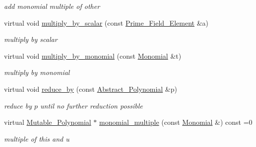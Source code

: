 \begin{Indent}
\begin{DoxyCompactItemize}
\begin{DoxyCompactList}\small\item\em add monomial multiple of other \end{DoxyCompactList}\item 
\mbox{\label{group__polygroup_a19f2326427ab08d6dc160c5eca898529}} 
virtual void \hyperlink{group__polygroup_a19f2326427ab08d6dc160c5eca898529}{multiply\+\_\+by\+\_\+scalar} (const \hyperlink{group___fields_group_class_prime___field___element}{Prime\+\_\+\+Field\+\_\+\+Element} \&a)
\begin{DoxyCompactList}\small\item\em multiply by scalar \end{DoxyCompactList}\item 
\mbox{\label{group__polygroup_a97a3ca070811ac495e8f22c3d7623225}} 
virtual void \hyperlink{group__polygroup_a97a3ca070811ac495e8f22c3d7623225}{multiply\+\_\+by\+\_\+monomial} (const \hyperlink{group__polygroup_class_monomial}{Monomial} \&t)
\begin{DoxyCompactList}\small\item\em multiply by monomial \end{DoxyCompactList}\item 
\mbox{\label{group__polygroup_a0f40d2041aa5c3447324bde0c14049e2}} 
virtual void \hyperlink{group__polygroup_a0f40d2041aa5c3447324bde0c14049e2}{reduce\+\_\+by} (const \hyperlink{group__polygroup_class_abstract___polynomial}{Abstract\+\_\+\+Polynomial} \&p)
\begin{DoxyCompactList}\small\item\em reduce by $p$ until no further reduction possible \end{DoxyCompactList}\item 
\mbox{\label{group__polygroup_a828c980c211687bcf752ed0562a1961e}} 
virtual \hyperlink{group__polygroup_class_mutable___polynomial}{Mutable\+\_\+\+Polynomial} $\ast$ \hyperlink{group__polygroup_a828c980c211687bcf752ed0562a1961e}{monomial\+\_\+multiple} (const \hyperlink{group__polygroup_class_monomial}{Monomial} \&) const =0
\begin{DoxyCompactList}\small\item\em multiple of this and u \end{DoxyCompactList}\item 

\end{DoxyCompactItemize}
\end{Indent}
